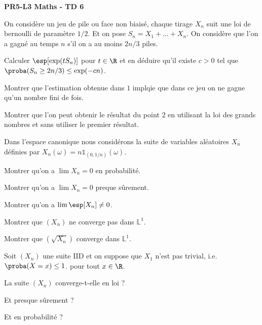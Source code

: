 \documentclass{report}
\begin{document}
\begin{center}
    \Huge{\textbf{PR5-L3 Maths - TD 6}}
\end{center}
\bigskip

\begin{exo}
    On considère un jeu de pile ou face non biaisé, chaque tirage
    \(X_n\) suit une loi de bernoulli de paramètre \(1/2\). Et on pose
    \(S_n=X_1+\dots+X_n\). On considère que l'on a gagné au temps \(n\)
    s'il on a au moins \(2n/3\) piles.

    \begin{q}{1}
        Calculer \(\esp[\exp(tS_n)]\) pour \(t\in \R\) et en déduire qu'il existe \(c>0\)
        tel que \(\proba(S_n\geq 2n/3)\leq \exp(-cn)\).
    \end{q}
    \begin{q}{2}
        Montrer que l'estimation obtenue dans \(1\) implqie que dans ce jeu on ne gagne qu'un
        nombre fini de fois.
    \end{q}
    \begin{q}{3}
        Montrer que l'on peut obtenir le résultat du point \(2\) en utilisant
        la loi des grands nombres et sans utiliser le premier résultat.
    \end{q}
\end{exo}

\begin{exo}
    Dans l'espace canonique nous considérons la suite de variables aléatoires \(X_n\)
    définies par \(X_n(\omega)=n\mathds{1}_{(0,1/n)}(\omega)\).
    \begin{q}{1}
        Montrer qu'on a \(\lim X_n = 0\) en probabilité.
    \end{q}
    \begin{q}{2}
        Montrer qu'on a \(\lim X_n = 0\) preque sûrement.
    \end{q}
    \begin{q}{3}
        Montrer qu'on a \(\lim \esp[X_n]\neq 0\).
    \end{q}
    \begin{q}{4}
        Montrer que \((X_n)\) ne converge pas dans \(\mathbb{L}^1\).
    \end{q}
    \begin{q}{5}
        Montrer que \((\sqrt{X_n})\) converge dans \(\mathbb{L}^1\).
    \end{q}
\end{exo}

\begin{exo}
    Soit \((X_n)\) une suite IID et on suppose que \(X_1\) n'est pas trivial, i.e. \(\proba(X=x)\leq 1\).
    pour tout \(x\in\R\).
    \begin{q}{1}
        La suite \((X_n)\) converge-t-elle en loi ?
    \end{q}
    \begin{q}{2}
        Et presque sûrement ?
    \end{q}
    \begin{q}{3}
        Et en probabilité ?
    \end{q}
\end{exo}
\end{document}
